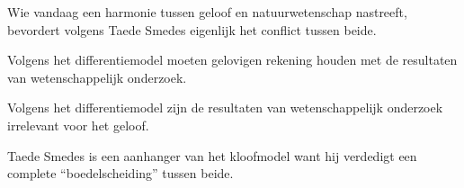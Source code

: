 \documentclass[main.tex]{subfiles}
\begin{document}
\begin{examenvraag}
\begin{stelling}
Wie vandaag een harmonie tussen geloof en natuurwetenschap nastreeft, bevordert volgens Taede Smedes eigenlijk het conflict tussen beide.
\end{stelling}

\begin{antwoord}
\end{antwoord}
\end{examenvraag}


\begin{examenvraag}
\begin{stelling}
Volgens het differentiemodel moeten gelovigen rekening houden met de resultaten van wetenschappelijk onderzoek.
\end{stelling}

\begin{antwoord}
\end{antwoord}
\end{examenvraag}


\begin{examenvraag}
\begin{stelling}
Volgens het differentiemodel zijn de resultaten van wetenschappelijk onderzoek irrelevant voor het geloof.
\end{stelling}

\begin{antwoord}
\end{antwoord}
\end{examenvraag}


\begin{examenvraag}
\begin{stelling}
Taede Smedes is een aanhanger van het kloofmodel want hij verdedigt een complete “boedelscheiding” tussen beide.
\end{stelling}

\begin{antwoord}
\end{antwoord}
\end{examenvraag}
\end{document}
